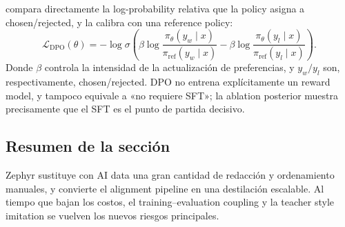  compara directamente la log-probability relativa que la policy asigna a chosen/rejected, y la calibra con una reference policy:
\[
\mathcal{L}_{\mathrm{DPO}}(\theta)
=-\log\sigma\!\left(
\beta\log\frac{\pi_{\theta}(y_w\mid x)}{\pi_{\mathrm{ref}}(y_w\mid x)}
-\beta\log\frac{\pi_{\theta}(y_l\mid x)}{\pi_{\mathrm{ref}}(y_l\mid x)}
\right).
\]
Donde $\beta$ controla la intensidad de la actualización de preferencias, y $y_w/y_l$ son, respectivamente, chosen/rejected. DPO no entrena explícitamente un reward model, y tampoco equivale a «no requiere SFT»; la ablation posterior muestra precisamente que el SFT es el punto de partida decisivo.


\subsection{Resumen de la sección}

Zephyr sustituye con AI data una gran cantidad de redacción y ordenamiento manuales, y convierte el alignment pipeline en una destilación escalable. Al tiempo que bajan los costos, el training--evaluation coupling y la teacher style imitation se vuelven los nuevos riesgos principales.

